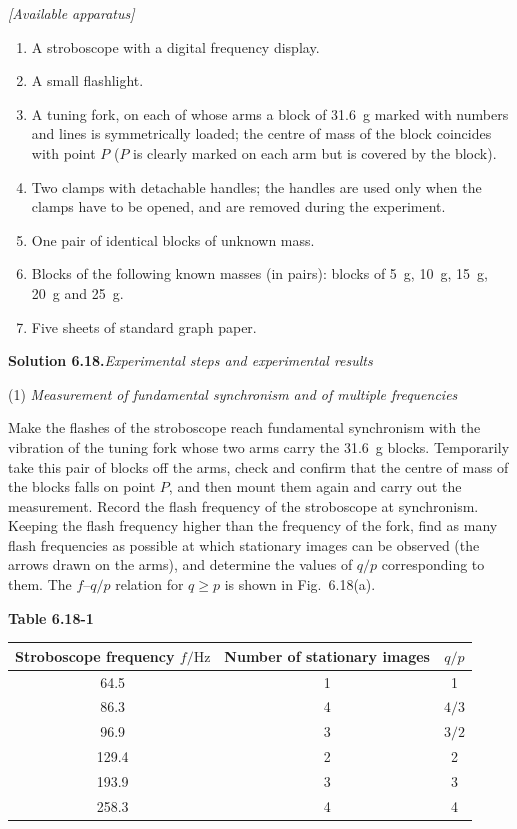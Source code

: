 \noindent\textit{[Available apparatus]}
\begin{enumerate}[label=(\arabic*),leftmargin=2.2em,itemsep=1pt,topsep=2pt]
\item A stroboscope with a digital frequency display.
\item A small flashlight.
\item A tuning fork, on each of whose arms a block of \SI{31.6}{g} marked with numbers and lines is symmetrically loaded; the centre of mass of the block coincides with point $P$ ($P$ is clearly marked on each arm but is covered by the block).
\item Two clamps with detachable handles; the handles are used only when the clamps have to be opened, and are removed during the experiment.
\item One pair of identical blocks of unknown mass.
\item Blocks of the following known masses (in pairs): blocks of \SI{5}{g}, \SI{10}{g}, \SI{15}{g}, \SI{20}{g} and \SI{25}{g}.
\item Five sheets of standard graph paper.
\end{enumerate}

\medskip
\noindent\textbf{Solution 6.18.}\quad \textit{Experimental steps and experimental results}

(1) \textit{Measurement of fundamental synchronism and of multiple frequencies}

Make the flashes of the stroboscope reach fundamental synchronism with the vibration of the tuning fork whose two arms carry the \SI{31.6}{g} blocks. Temporarily take this pair of blocks off the arms, check and confirm that the centre of mass of the blocks falls on point $P$, and then mount them again and carry out the measurement. Record the flash frequency of the stroboscope at synchronism. Keeping the flash frequency higher than the frequency of the fork, find as many flash frequencies as possible at which stationary images can be observed (the arrows drawn on the arms), and determine the values of $q/p$ corresponding to them. The $f$--$q/p$ relation for $q\ge p$ is shown in Fig.~6.18(a).

\begin{center}
\begin{minipage}{\linewidth}
\centering
\textbf{Table 6.18-1}\\[3pt]
\begin{tabular}{ccc}
\toprule
Stroboscope frequency $f/\mathrm{Hz}$ & Number of stationary images & $q/p$\\
\midrule
64.5  & 1 & 1\\
86.3  & 4 & $4/3$\\
96.9  & 3 & $3/2$\\
129.4 & 2 & 2\\
193.9 & 3 & 3\\
258.3 & 4 & 4\\
\bottomrule
\end{tabular}
\end{minipage}
\end{center}

